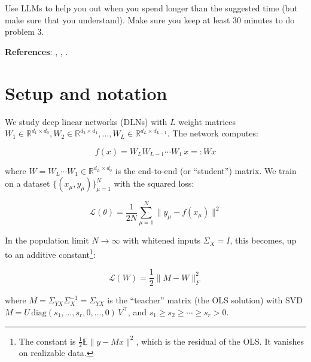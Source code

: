 \documentclass[11pt]{article}
\begin{document}
Use LLMs to help you out when you spend longer than the suggested time (but make sure that you understand). Make sure you keep at least 30 minutes to do problem 3.

\textbf{References}: \cite{saxe2014}, \cite{achour2024}, \cite{tu2024}.

\section{Setup and notation}

We study deep linear networks (DLNs) with \(L\) weight matrices
\(W_1 \in \mathbb{R}^{d_1 \times d_0}, W_2 \in \mathbb{R}^{d_2 \times d_1}, \ldots, W_L \in \mathbb{R}^{d_L \times d_{L-1}}\).
The network computes:

\[f(x) = W_L W_{L-1} \cdots W_1 \, x =: W x\]

where \(W = W_L \cdots W_1 \in \mathbb{R}^{d_L \times d_0}\) is the
end-to-end (or ``student'') matrix. We train on a dataset
\(\{(x_\mu, y_\mu)\}_{\mu=1}^N\) with the squared loss:

\[\mathcal{L}(\theta) = \frac{1}{2N} \sum_{\mu=1}^{N} \|y_\mu - f(x_\mu)\|^2\]

In the population limit \(N \to \infty\) with whitened inputs \(\Sigma_X = I\), this becomes, up to an additive constant\footnote{The constant is \(\frac{1}{2}\mathbb{E}\|y - Mx\|^2\), which is the residual of the OLS. It vanishes on realizable data.}:

\[\mathcal{L}(W) = \frac{1}{2}\|M - W\|_F^2\]

where \(M = \Sigma_{YX} \Sigma_X^{-1} = \Sigma_{YX}\) is the ``teacher'' matrix (the
OLS solution) with SVD
\(M = U \,\text{diag}(s_1, \ldots, s_r, 0, \ldots, 0)\, V^\top\), and
\(s_1 \geq s_2 \geq \cdots \geq s_r > 0\).

%
%
%
%
%
%
\end{document}
